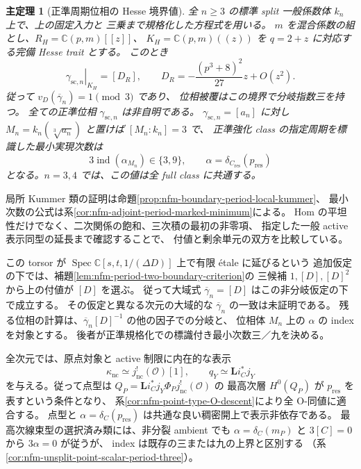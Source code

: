 \documentclass[11pt,a4paper]{ltjsarticle}
\numberwithin{equation}{section}
\newtheorem{maintheorem}{主定理}
\newcommand{\C}{\mathbb C}
\newcommand{\Spec}{\operatorname{Spec}}
\begin{document}
\begin{maintheorem}[正準周期位相の Hesse 境界値]
\label{main:nfm-period-hesse-boundary}
全 $n\ge3$ の標準 split 一般係数体 $k_n$ 上で、上の固定入力と
三乗まで規格化した方程式を用いる。
$m$ を混合係数の組とし、$R_H=\C(p,m)[[z]]$、
$K_H=\C(p,m)((z))$ を $q=2+z$ に対応する完備 Hesse trait とする。
このとき
\[
 \left.\gamma_{\mathrm{sc},n}\right|_{K_H}=[D_R],\qquad
 D_R=-\frac{(p^3+8)^2}{27}z+O(z^2).
\]
従って $v_D(\overline\gamma_n)=1\pmod3$ であり、
位相被覆はこの境界で分岐指数三を持つ。
全ての正準位相 $\gamma_{\mathrm{sc},n}$ は非自明である。
$\gamma_{\mathrm{sc},n}=[a_n]$ に対し
$M_n=k_n(\sqrt[3]{a_n})$ と置けば $[M_n:k_n]=3$ で、
正準強化 class の指定周期を標識した最小実現次数は
\[
 3\operatorname{ind}(\alpha_{M_n})\in\{3,9\},
 \qquad \alpha=\delta_{C_{\mathrm{res}}}(p_{\mathrm{res}})
\]
となる。$n=3,4$ では、この値は全 full class に共通する。
\end{maintheorem}

局所 Kummer 類の証明は命題\ref{prop:nfm-boundary-period-local-kummer}、
最小次数の公式は系\ref{cor:nfm-adjoint-period-marked-minimum}による。
Hom の平坦性だけでなく、二次関係の飽和、三次積の最初の非零項、
指定した一般 active 表示同型の延長まで確認することで、
付値と剰余単元の双方を比較している。

この torsor が $\Spec\C[s,t,1/(\Delta D)]$ 上で有限 \'etale に延びるという
追加仮定の下では、補題\ref{lem:nfm-period-two-boundary-criterion}の
三候補 $1,[D],[D]^2$ から上の付値が $[D]$ を選ぶ。
従って大域式 $\overline\gamma_n=[D]$ はこの非分岐仮定の下で成立する。
その仮定と異なる次元の大域的な $\overline\gamma_n$ の一致は未証明である。
残る位相の計算は、$\overline\gamma_n[D]^{-1}$ の他の因子での分岐と、
位相体 $M_n$ 上の $\alpha$ の index を対象とする。
後者が正準規格化での標識付き最小次数三／九を決める。

全次元では、原点対象と active 制限に内在的な表示
\[
 \kappa_{\mathrm{nc}}\simeq j_{\mathrm{nc}}^!(\mathcal O)[1],
 \qquad q_Y\simeq\mathbf Li_C^*j_Y
\]
を与える。従って点型は
$Q_P=\mathbf Li_C^*j_Y\Phi_Pj_{\mathrm{nc}}^!(\mathcal O)$ の
最高次層 $H^0(Q_P)$ が $p_{\mathrm{res}}$ を表すという条件となり、
系\ref{cor:nfm-point-type-O-descent}により全 O-同値に適合する。
点型と $\alpha=\delta_C(p_{\mathrm{res}})$ は共通な良い稠密開上で表示非依存である。
最高次線束型の選択済み類には、非分裂 ambient でも
$\alpha=\delta_C(m_P)$ と $3[C]=0$ から $3\alpha=0$ が従うが、
index は既存の三または九の上界と区別する
（系\ref{cor:nfm-unsplit-point-scalar-period-three}）。
\end{document}
